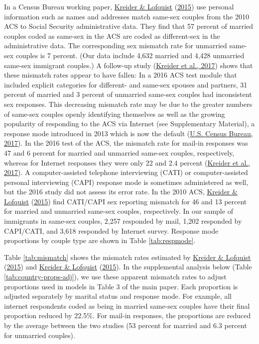 \documentclass[
  11pt,
]{article}
\begin{document}
In a Census Bureau working paper, \protect\hyperlink{ref-kreider_2015}{Kreider \& Lofquist} (\protect\hyperlink{ref-kreider_2015}{2015}) use personal information such as names and addresses match same-sex couples from the 2010 ACS to Social Security administrative data. They find that 57 percent of married couples coded as same-sex in the ACS are coded as different-sex in the administrative data. The corresponding sex mismatch rate for unmarried same-sex couples is 7 percent. (Our data include 4,632 married and 4,428 unmarried same-sex immigrant couples.) A follow-up study (\protect\hyperlink{ref-kreider_2017}{Kreider et al., 2017}) shows that these mismatch rates appear to have fallen: In a 2016 ACS test module that included explicit categories for different- and same-sex spouses and partners, 31 percent of married and 3 percent of unmarried same-sex couples had inconsistent sex responses. This decreasing mismatch rate may be due to the greater numbers of same-sex couples openly identifying themselves as well as the growing popularity of responding to the ACS via Internet (see Supplementary Material), a response mode introduced in 2013 which is now the default (\protect\hyperlink{ref-u.s.censusbureau_2017}{U.S. Census Bureau, 2017}). In the 2016 test of the ACS, the mismatch rate for mail-in responses was 47 and 6 percent for married and unmarried same-sex couples, respectively, whereas for Internet responses they were only 22 and 2.4 percent (\protect\hyperlink{ref-kreider_2017}{Kreider et al., 2017}). A computer-assisted telephone interviewing (CATI) or computer-assisted personal interviewing (CAPI) response mode is sometimes administered as well, but the 2016 study did not assess its error rate. In the 2010 ACS, \protect\hyperlink{ref-kreider_2015}{Kreider \& Lofquist} (\protect\hyperlink{ref-kreider_2015}{2015}) find CATI/CAPI sex reporting mismatch for 46 and 13 percent for married and unmarried same-sex couples, respectively. In our sample of immigrants in same-sex couples, 2,257 responded by mail, 1,202 responded by CAPI/CATI, and 3,618 responded by Internet survey. Response mode proportions by couple type are shown in Table \ref{tab:respmode}.

Table \ref{tab:mismatch} shows the mismatch rates estimated by \protect\hyperlink{ref-kreider_2015}{Kreider \& Lofquist} (\protect\hyperlink{ref-kreider_2015}{2015}) and \protect\hyperlink{ref-kreider_2015}{Kreider \& Lofquist} (\protect\hyperlink{ref-kreider_2015}{2015}). In the supplemental analysis below (Table \ref{tab:country-props-adj}), we use these apparent mismatch rates to adjust proportions used in models in Table 3 of the main paper. Each proportion is adjusted separately by marital status and response mode. For example, all internet respondents coded as being in married same-sex couples have their final proportion reduced by 22.5\%. For mail-in responses, the proportions are reduced by the average between the two studies (53 percent for married and 6.3 percent for unmarried couples).
\end{document}

